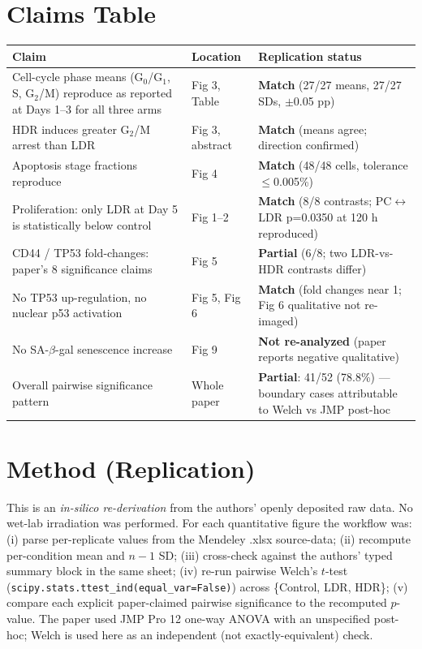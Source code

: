 \documentclass[11pt]{article}
\begin{document}
\section{Claims Table}
\begin{longtable}{p{} p{} p{}}
\toprule
\textbf{Claim} & \textbf{Location} & \textbf{Replication status} \\
\midrule
Cell-cycle phase means (G$_0$/G$_1$, S, G$_2$/M) reproduce as reported at Days 1--3 for all three arms & Fig 3, Table & \textbf{Match} (27/27 means, 27/27 SDs, $\pm$0.05 pp) \\
HDR induces greater G$_2$/M arrest than LDR & Fig 3, abstract & \textbf{Match} (means agree; direction confirmed) \\
Apoptosis stage fractions reproduce & Fig 4 & \textbf{Match} (48/48 cells, tolerance $\le$0.005\%) \\
Proliferation: only LDR at Day 5 is statistically below control & Fig 1--2 & \textbf{Match} (8/8 contrasts; PC$\leftrightarrow$LDR p=0.0350 at 120 h reproduced) \\
CD44 / TP53 fold-changes: paper's 8 significance claims & Fig 5 & \textbf{Partial} (6/8; two LDR-vs-HDR contrasts differ) \\
No TP53 up-regulation, no nuclear p53 activation & Fig 5, Fig 6 & \textbf{Match} (fold changes near 1; Fig 6 qualitative not re-imaged) \\
No SA-$\beta$-gal senescence increase & Fig 9 & \textbf{Not re-analyzed} (paper reports negative qualitative) \\
Overall pairwise significance pattern & Whole paper & \textbf{Partial}: 41/52 (78.8\%) --- boundary cases attributable to Welch vs JMP post-hoc \\
\bottomrule
\end{longtable}

\section{Method (Replication)}
This is an \emph{in-silico re-derivation} from the authors' openly deposited raw data. No wet-lab
irradiation was performed. For each quantitative figure the workflow was:
(i) parse per-replicate values from the Mendeley .xlsx source-data;
(ii) recompute per-condition mean and $n{-}1$ SD;
(iii) cross-check against the authors' typed summary block in the same sheet;
(iv) re-run pairwise Welch's $t$-test (\texttt{scipy.stats.ttest\_ind(equal\_var=False)}) across
\{Control, LDR, HDR\};
(v) compare each explicit paper-claimed pairwise significance to the recomputed $p$-value.
The paper used JMP Pro 12 one-way ANOVA with an unspecified post-hoc; Welch is used here as an
independent (not exactly-equivalent) check.
\end{document}
